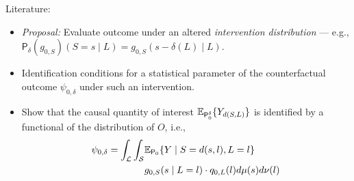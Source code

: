 \documentclass{beamer}
\begin{document}
\begin{frame}[c]{Literature: \cite{diaz2012population, diaz2018stochastic}}

\begin{center}
\begin{itemize}
  \itemsep8pt
  \item \textit{Proposal:} Evaluate outcome under an altered
    \textit{intervention distribution} --- e.g.,
    $\mathsf{P}_{\delta}(g_{0,S})(S = s \mid L) = g_{0,S}(s - \delta(L) \mid L)$.
  \item Identification conditions for a statistical parameter of the
    counterfactual outcome $\psi_{0,\delta}$ under such an intervention.
  \item Show that the causal quantity of interest $\mathbb{E}_{\mathsf{P}_0^{\delta}}
    \{Y_{d(S, L)}\}$ is identified by a functional of the distribution of $O$,
    i.e.,
    \begin{align*}\label{eqn:identification2012}
      \psi_{0,\delta} = \int_{\mathcal{L}} \int_{\mathcal{S}} &\mathbb{E}_{\mathsf{P}_0}
        \{Y \mid S = d(s, l), L = l\} \\ &g_{0, S}(s \mid L = l) \cdot
        q_{0, L}(l) d\mu(s)d\nu(l)
    \end{align*}
\end{itemize}
\end{center}


\end{frame}

\end{document}
